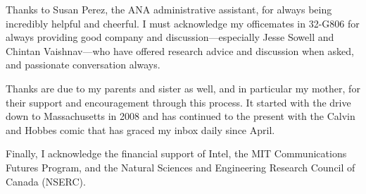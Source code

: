 Thanks to Susan Perez, the ANA administrative assistant, for always being
incredibly helpful and cheerful. I must acknowledge my officemates in 32-G806
for always providing good company and discussion---especially Jesse Sowell and
Chintan Vaishnav---who have offered research advice and discussion when
asked, and passionate conversation always.

Thanks are due to my parents and sister as well, and in particular my mother,
for their support and encouragement through this process. It started with the
drive down to Massachusetts in 2008 and has continued to the present with
the Calvin and Hobbes comic that has graced my inbox daily since April.

Finally, I acknowledge the financial support of Intel, the MIT Communications
Futures Program, and the Natural Sciences and Engineering Research Council of
Canada (NSERC).
